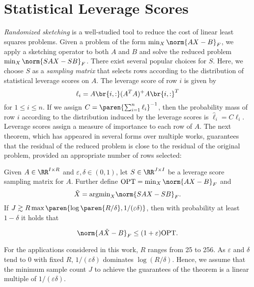 \section{Statistical Leverage Scores}
\textit{Randomized sketching} is a well-studied tool to reduce the
cost of linear least squares problems. Given a problem of the form
$\min_X \norm{AX - B}_F$, we apply a sketching operator to both
$A$ and $B$ and solve the reduced problem $\min_X \norm{SAX - SB}_F$. 
There exist several popular choices for $S$. Here, we choose $S$
as a \textit{sampling matrix} that selects rows according to the
distribution of statistical leverage scores on $A$. The leverage 
score of row $i$ is given by
\begin{equation}
\ell_i = A\br{i, :} (A^T A)^+ A \br{i, :}^T
\label{eq:leverage_definition}
\end{equation}
for $1 \leq i \leq n$. If we assign 
$C = \paren{\sum_{i=1}^n \ell_i}^{-1}$, then the
probability mass of row $i$ according to the distribution induced
by the leverage scores is $\hat \ell_i = C \ell_i$. Leverage 
scores assign a measure of importance to each row of $A$.
The next theorem, which has appeared in several forms over
multiple works, guarantees that the residual of the reduced
problem is close to the residual of the original problem,
provided an appropriate number of rows selected: 

\begin{theorem} 
Given $A \in \RR^{I \times R}$ and $\varepsilon, \delta \in (0, 1)$, 
let $S \in \RR^{J \times I}$ be a leverage score sampling matrix
for $A$. Further define $\textrm{OPT} = \min_X \norm{AX - B}_F$
and $$\tilde X = \textrm{argmin}_X \norm{SAX - SB}_F.$$ If $J \gtrsim
R \max \paren{\log \paren{R / \delta}, 1 / (\varepsilon \delta)}$, then
with probability at least $1 - \delta$ it holds that

$$\norm{A \tilde X - B}_F \leq (1 + \varepsilon)\textrm{OPT}.$$
\label{thm:lev_score_lowerbounds}
\end{theorem}
For the applications considered in this work, $R$ ranges from 25
to 256. As $\varepsilon$ and $\delta$ tend to 0 with fixed $R$, 
$1 / (\varepsilon \delta)$ dominates $\log(R / \delta)$. Hence, 
we assume that the minimum sample count $J$ to achieve the
guarantees of the theorem is a linear multiple of 
$1 / (\varepsilon \delta)$.

